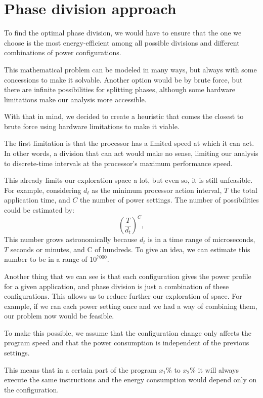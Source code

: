 \section{Phase division approach} \label{sec:application_partition_method}
To find the optimal phase division, we would have to ensure that the one we choose is the most energy-efficient among all possible divisions and different combinations of power configurations.

This mathematical problem can be modeled in many ways, but always with some concessions to make it solvable. Another option would be by brute force, but there are infinite possibilities for splitting phases, although some hardware limitations make our analysis more accessible.

With that in mind, we decided to create a heuristic that comes the closest to brute force using hardware limitations to make it viable.

The first limitation is that the processor has a limited speed at which it can act. In other words, a division that can act would make no sense, limiting our analysis to discrete-time intervals at the processor's maximum performance speed.

This already limits our exploration space a lot, but even so, it is still unfeasible. For example, considering $d_t$ as the minimum processor action interval, $T$ the total application time, and $C$ the number of power settings. The number of possibilities could be estimated by:
\begin{equation}
	\left(\frac{T}{d_t}\right)^C,
\end{equation}
This number grows astronomically because $d_t$ is in a time range of microseconds, $T$ seconds or minutes, and C of hundreds. To give an idea, we can estimate this number to be in a range of $10^7000$.

Another thing that we can see is that each configuration gives the power profile for a given application, and phase division is just a combination of these configurations. This allows us to reduce further our exploration of space. For example, if we ran each power setting once and we had a way of combining them, our problem now would be feasible.

To make this possible, we assume that the configuration change only affects the program speed and that the power consumption is independent of the previous settings.

\iffalse %
This means that in a certain part of the program $x_1$\% to $x_2$\% it will always execute the same instructions and the energy consumption would depend only on the configuration.

